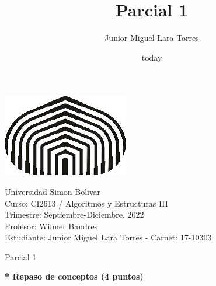 \documentclass[a4paper,12pt]{article}
\title{Parcial 1}
\author{Junior Miguel Lara Torres}
\date{today}
\begin{document}
\begin{center}
\par \includegraphics[scale=1]{USB} \par
Universidad Simon Bolivar \\ Curso: CI2613 / Algoritmos y Estructuras III \\ Trimestre: Septiembre-Diciembre, 2022 \\ Profesor: Wilmer Bandres \\ Estudiante: Junior Miguel Lara Torres - Carnet: 17-10303 \\
\end{center}

\begin{center}
Parcial 1
\end{center}

\textbf{ * Repaso de conceptos (4 puntos)}
\end{document}
